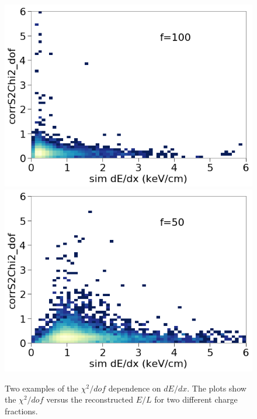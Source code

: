 \begin{figure}[htbp]
\begin{center}
\includegraphics[width=\halffig]{figures/lips/chi2_dedx_f100.png}
\includegraphics[width=\halffig]{figures/lips/chi2_dedx_f50.png}
\caption{ Two examples of the $\chi^{2}/dof$ dependence on $dE/dx$. The plots show the $\chi^{2}/dof$ versus the reconstructed $E/L$ for two different charge fractions. }
\label{fig:chi2_dedx}
\end{center}
\end{figure}

